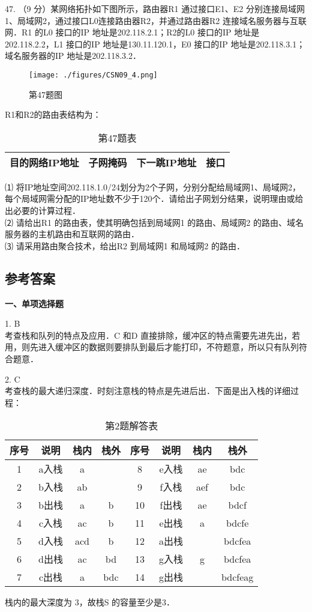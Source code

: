 47. （9 分）某网络拓扑如下图所示，路由器R1 通过接口E1、E2 分别连接局域网1、局域网2，通过接口L0连接路由器R2，并通过路由器R2 连接域名服务器与互联网．R1 的L0 接口的IP 地址是202.118.2.1；R2的L0 接口的IP 地址是202.118.2.2，L1 接口的IP 地址是130.11.120.1，E0 接口的IP 地址是202.118.3.1；域名服务器的IP 地址是202.118.3.2．
\begin{figure}[ht]
\centering
\texttt{[image: ./figures/CSN09\_4.png]}
\caption{第47题图} \label{CSN09_fig4}
\end{figure}
R1和R2的路由表结构为： \\
\begin{table}[ht]
\centering
\caption{第47题表}\label{CSN09_tab4}
\begin{tabular}{|c|c|c|c|}
\hline
目的网络IP地址 & 子网掩码 & 下一跳IP地址 & 接口 \\
\hline
\end{tabular}
\end{table}
⑴ 将IP地址空间202.118.1.0/24划分为2个子网，分别分配给局域网1、局域网2，每个局域网需分配的IP地址数不少于120个．请给出子网划分结果，说明理由或给出必要的计算过程． \\
⑵ 请给出R1 的路由表，使其明确包括到局域网1 的路由、局域网2 的路由、域名服务器的主机路由和互联网的路由． \\
⑶ 请采用路由聚合技术，给出R2 到局域网1 和局域网2 的路由．

\subsection{参考答案}
\textbf{一、单项选择题}

1. B \\
考查栈和队列的特点及应用．C 和D 直接排除，缓冲区的特点需要先进先出，若用，则先进入缓冲区的数据则要排队到最后才能打印，不符题意，所以只有队列符合题意．

2. C \\
考查栈的最大递归深度．时刻注意栈的特点是先进后出．下面是出入栈的详细过程：
\begin{table}[ht]
\centering
\caption{第2题解答表}\label{CSN09_tab5}
\begin{tabular}{|c|c|c|c|c|c|c|c|}
\hline
序号 & 说明 & 栈内 & 栈外 & 序号 & 说明 & 栈内 & 栈外 \\
\hline
1 & a入栈 & a & & 8 & e入栈 & ae & bdc \\
\hline
2 & b入栈 & ab & & 9 & f入栈 & aef & bdc \\
\hline
3 & b出栈 & a & b & 10 & f出栈 & ae & bdcf \\
\hline
4 & c入栈 & ac & b & 11 & e出栈 & a & bdcfe \\
\hline
5 & d入栈 & acd & b & 12 & a出栈 & & bdcfea \\
\hline
6 & d出栈 & ac & bd & 13 & g入栈 & g & bdcfea \\
\hline
7 & c出栈 & a & bdc & 14 & g出栈 & & bdcfeag \\
\hline
\end{tabular}
\end{table}
栈内的最大深度为 3，故栈S 的容量至少是3．


